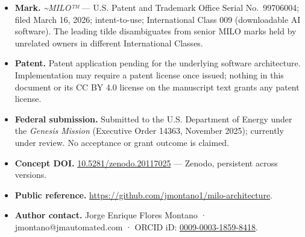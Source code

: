 \begin{itemize}
\tightlist
\item
  \textbf{Mark.} \emph{\textasciitilde MILO™} --- U.S. Patent and
  Trademark Office Serial No.~99706004; filed March 16, 2026;
  intent-to-use; International Class 009 (downloadable AI software). The
  leading tilde disambiguates from senior MILO marks held by unrelated
  owners in different International Classes.
\item
  \textbf{Patent.} Patent application pending for the underlying
  software architecture. Implementation may require a patent license
  once issued; nothing in this document or its CC BY 4.0 license on the
  manuscript text grants any patent license.
\item
  \textbf{Federal submission.} Submitted to the U.S. Department of
  Energy under the \emph{Genesis Mission} (Executive Order 14363,
  November 2025); currently under review. No acceptance or grant outcome
  is claimed.
\item
  \textbf{Concept DOI.}
  \href{https://doi.org/10.5281/zenodo.20117025}{10.5281/zenodo.20117025}
  --- Zenodo, persistent across versions.
\item
  \textbf{Public reference.}
  \url{https://github.com/jmontano1/milo-architecture}.
\item
  \textbf{Author contact.} Jorge Enrique Flores Montano ·
  jmontano@jmautomated.com · ORCID iD:
  \href{https://orcid.org/0009-0003-1859-8418}{0009-0003-1859-8418}.
\end{itemize}
